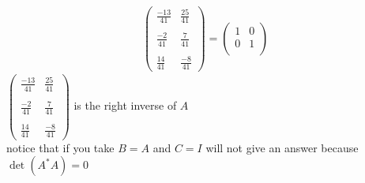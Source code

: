 \documentclass[]{article}
\begin{document}
\begin{example}
\begin{align*}
\begin{pmatrix}
                        \displaystyle \frac{-13}{41} & \displaystyle \frac{25}{41}\\\\
                        \displaystyle \frac{-2}{41} & \displaystyle \frac{7}{41}\\\\
                        \displaystyle \frac{14}{41} & \displaystyle \frac{-8}{41}
                \end{pmatrix} = \begin{pmatrix}
                        1 & 0 \\
                        0 & 1 \\
                    \end{pmatrix}
        \end{align*}
$
\begin{pmatrix}
        \displaystyle \frac{-13}{41} & \displaystyle \frac{25}{41}\\\\
        \displaystyle \frac{-2}{41} & \displaystyle \frac{7}{41}\\\\
        \displaystyle \frac{14}{41} & \displaystyle \frac{-8}{41}
\end{pmatrix}
$ is the right inverse of $A$
\\
notice that if you take $B = A$ and $C = I$ will not give an answer because $\det(A^{*}A) = 0$
\end{example}
\end{document}

